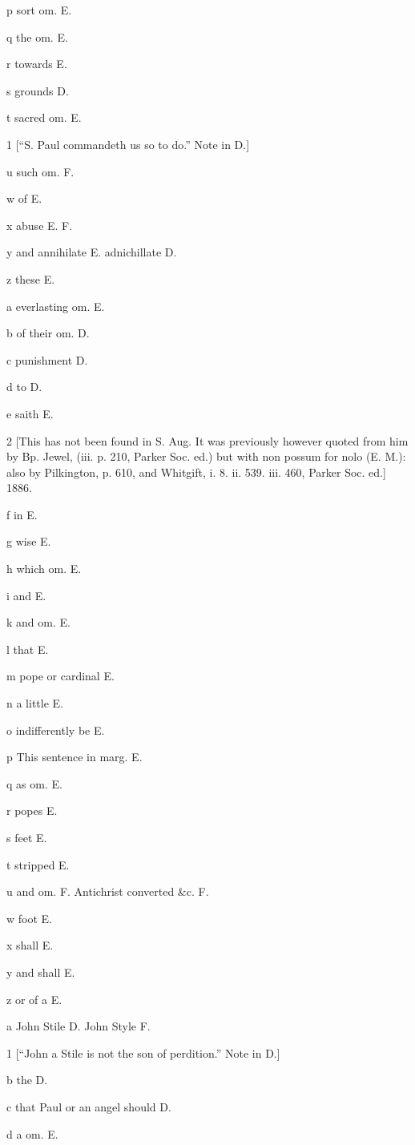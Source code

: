 p
sort om. E.

q
the om. E.

r
towards E.

s
grounds D.

t
sacred om. E.

1
[“S. Paul commandeth us so to do.” Note in D.]

u
such om. F.

w
of E.

x
abuse E. F.

y
and annihilate E. adnichillate D.

z
these E.

a
everlasting om. E.

b
of their om. D.

c
punishment D.

d
to D.

e
saith E.

2
[This has not been found in S. Aug. It was previously however quoted from him by Bp. Jewel, (iii. p. 210, Parker Soc. ed.) but with non possum for nolo (E. M.): also by Pilkington, p. 610, and Whitgift, i. 8. ii. 539. iii. 460, Parker Soc. ed.] 1886.

f
in E.

g
wise E.

h
which om. E.

i
and E.

k
and om. E.

l
that E.

m
pope or cardinal E.

n
a little E.

o
indifferently be E.

p
This sentence in marg. E.

q
as om. E.

r
popes E.

s
feet E.

t
stripped E.

u
and om. F. Antichrist converted &c. F.

w
foot E.

x
shall E.

y
and shall E.

z
or of a E.

a
John Stile D. John Style F.

1
[“John a Stile is not the son of perdition.” Note in D.]

b
the D.

c
that Paul or an angel should D.

d
a om. E.


